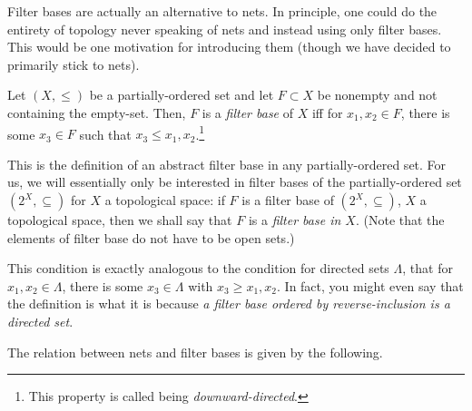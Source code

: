 Filter bases are actually an alternative to nets.  In principle, one could do the entirety of topology never speaking of nets and instead using only filter bases.  This would be one motivation for introducing them (though we have decided to primarily stick to nets).
\begin{dfn}\label{FilterBase}
Let $(X,\leq )$ be a partially-ordered set and let $F\subset X$ be nonempty and not containing the empty-set.  Then, $F$ is a \emph{filter base} of $X$ iff for $x_1,x_2\in F$, there is some $x_3\in F$ such that $x_3\leq x_1,x_2$.\footnote{This property is called being \emph{downward-directed}.}
\begin{rmk}
This is the definition of an abstract filter base in any partially-ordered set.  For us, we will essentially only be interested in filter bases of the partially-ordered set $(2^X,\subseteq )$ for $X$ a topological space:  if $F$ is a filter base of $(2^X,\subseteq )$, $X$ a topological space, then we shall say that $F$ is a \emph{filter base in $X$}.  (Note that the elements of filter base do not have to be open sets.)
\end{rmk}
\begin{rmk}
This condition is exactly analogous to the condition for directed sets $\Lambda$, that for $x_1,x_2\in \Lambda$, there is some $x_3\in \Lambda$ with $x_3\geq x_1,x_2$.  In fact, you might even say that the definition is what it is because \emph{a filter base ordered by reverse-inclusion is a directed set}.
\end{rmk}
\end{dfn}
The relation between nets and filter bases is given by the following.
